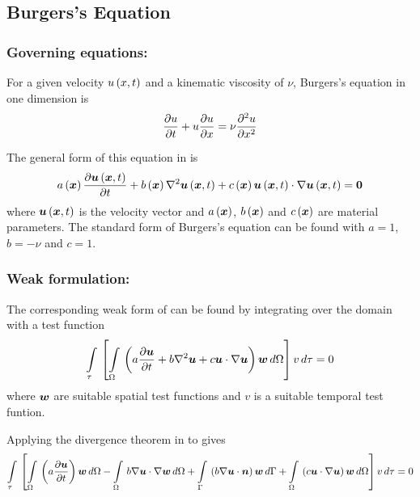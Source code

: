 \subsection{Burgers's Equation}

\subsubsection{Governing equations:}

For a given velocity $ u\left( x,t \right) $ and a kinematic viscosity of $\nu$, Burgers's equation
in one dimension is
\begin{equation}
   \dfrac{\partial u}{\partial t} +u \dfrac{\partial u}{\partial x} =\nu \dfrac{\partial^{2} u}{\partial {x}^{2}} 
  \label{eqn:Burgersequation}
\end{equation}

The general form of this equation in \OpenCMISS is
\begin{equation}
  \fnof{a}{\vect{x}}\delby{\fnof{\vect{u}}{\vect{x},t}}{t}+\fnof{b}{\vect{x}}\laplacian{\fnof{\vect{u}}{\vect{x},t}}+
  \fnof{c}{\vect{x}}\dotprod{\fnof{\vect{u}}{\vect{x},t}}{\gradient{\fnof{\vect{u}}{\vect{x},t}}}=\vect{0}
  \label{eqn:GeneralFormBurgersequation}
\end{equation}
where $\fnof{\vect{u}}{\vect{x},t}$ is the velocity vector and
$\fnof{a}{\vect{x}}$, $\fnof{b}{\vect{x}}$ and $\fnof{c}{\vect{x}}$ are
material parameters. The standard form of Burgers's equation can be found with
$a=1$, $b=-\nu$ and $c=1$.

\subsubsection{Weak formulation:}

The corresponding weak form of  can be
found by integrating over the domain with a test function \ie
\begin{equation}
  \gint{\tau}{}{\sqbrac{\gint{\Omega}{}{\pbrac{a\delby{\vect{u}}{t}+
          b\laplacian{\vect{u}}+
          c\dotprod{\vect{u}}{\gradient{\vect{u}}}}\vect{w}}{\Omega}}v}{\tau}=0
  \label{eqn:Burgersweakform1}
\end{equation}
where $\vect{w}$ are suitable spatial test functions and $v$ is a suitable temporal
test funtion.

Applying the divergence theorem in  to  gives
\begin{equation}
  \gint{\tau}{}{\sqbrac{\gint{\Omega}{}{\pbrac{a\delby{\vect{u}}{t}}\vect{w}}{\Omega}-
      \gint{\Omega}{}{b\dotprod{\gradient{\vect{u}}}{\gradient{\vect{w}}}}{\Omega}
      +\gint{\Gamma}{}{\pbrac{b\dotprod{\gradient{\vect{u}}}{\vect{n}}}\vect{w}}{\Gamma}+
      \gint{\Omega}{}{\pbrac{c\dotprod{\vect{u}}{\gradient{\vect{u}}}}\vect{w}}{\Omega}}v}{\tau}=0
  \label{eqn:Burgersweakform2}
\end{equation}

